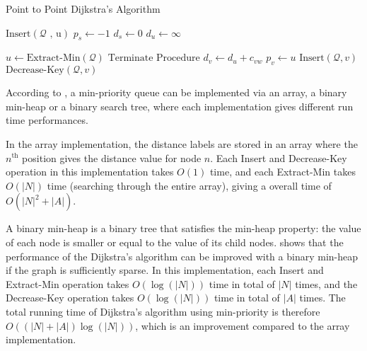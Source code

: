 \begin{algorithm}[!ht]
    \caption{Point to Point Dijkstra's Algorithm}
    \label{algo:p2pdijkstra}
    \begin{algorithmic}[1]
        \State $\text{Insert}(\mathcal{Q}\text{ , u})$ 
        \State $p_s \gets -1$ 
        \State $d_s \gets 0$
         
        \State $d_u \gets \infty$
    \EndFor

    \State $ u \gets \text{Extract-Min}(\mathcal{Q}) $ 
    \State $\text{Terminate Procedure}$ 
\EndIf
 
\State $d_v \gets d_u + c_{vw}$
\State $p_v \gets u$
\State $\text{Insert}(\mathcal{Q}, v)$ 
\Else
\State $\text{Decrease-Key}(\mathcal{Q}, v)$ 
    \EndIf
\EndIf
                \EndFor
            \EndIf
        \EndWhile
    \EndProcedure
\end{algorithmic}
\end{algorithm}

According to \citet{Cormen},
a min-priority queue can be implemented via an array, a binary min-heap or a binary search tree,
where each implementation gives different run time performances.

In the array implementation,
the distance labels are stored in an array where the $n^{\text{th}}$ position gives the distance value for node $n$.
Each Insert and Decrease-Key operation in this implementation takes $O(1)$ time, and each Extract-Min takes $O(|N|)$ time (searching through the entire array), giving a overall time of $O(|N|^2 + |A|)$.

A binary min-heap is a binary tree that satisfies the min-heap property:
the value of each node is smaller or equal to the value of its child nodes.
\citet{Cormen} shows that the performance of the Dijkstra's algorithm can be improved with a binary min-heap if the graph is sufficiently sparse.
In this implementation, each Insert and Extract-Min operation takes $O(\log(|N|))$ time in total of $|N|$ times,
and the Decrease-Key operation takes $O(\log(|N|))$ time in total of $|A|$ times.
The total running time of Dijkstra's algorithm using min-priority is therefore $O((|N|+|A|)\log(|N|))$,
which is an improvement compared to the array implementation.

